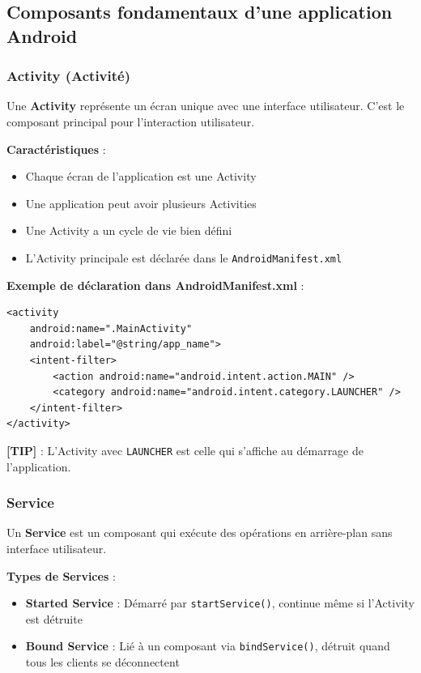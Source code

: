 \documentclass[11pt,a4paper]{article}
\begin{document}
\subsection{Composants fondamentaux d'une application Android}

\subsubsection{Activity (Activité)}

Une \textbf{Activity} représente un écran unique avec une interface utilisateur. C'est le composant principal pour l'interaction utilisateur.

\textbf{Caractéristiques} :
\begin{itemize}
    \item Chaque écran de l'application est une Activity
    \item Une application peut avoir plusieurs Activities
    \item Une Activity a un cycle de vie bien défini
    \item L'Activity principale est déclarée dans le \texttt{AndroidManifest.xml}
\end{itemize}

\textbf{Exemple de déclaration dans AndroidManifest.xml} :
\begin{lstlisting}[style=XML]
<activity
    android:name=".MainActivity"
    android:label="@string/app_name">
    <intent-filter>
        <action android:name="android.intent.action.MAIN" />
        <category android:name="android.intent.category.LAUNCHER" />
    </intent-filter>
</activity>
\end{lstlisting}

\textbf{[TIP]} : L'Activity avec \texttt{LAUNCHER} est celle qui s'affiche au démarrage de l'application.

\subsubsection{Service}

Un \textbf{Service} est un composant qui exécute des opérations en arrière-plan sans interface utilisateur.

\textbf{Types de Services} :
\begin{itemize}
    \item \textbf{Started Service} : Démarré par \texttt{startService()}, continue même si l'Activity est détruite
    \item \textbf{Bound Service} : Lié à un composant via \texttt{bindService()}, détruit quand tous les clients se déconnectent
\end{itemize}
\end{document}
